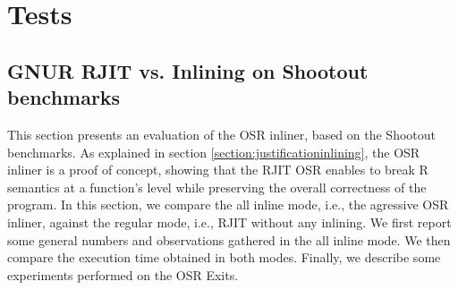 \section{Tests}
\subsection{GNUR RJIT vs. Inlining on Shootout benchmarks}

     


This section presents an evaluation of the OSR inliner, based on the Shootout benchmarks\cite{Shootout}.
As explained in section \ref{section:justificationinlining}, the OSR inliner is a proof of concept, showing that the RJIT OSR enables to break R semantics at a function's level while preserving the overall correctness of the program.
In this section, we compare the all inline mode, i.e., the agressive OSR inliner, against the regular mode, i.e., RJIT without any inlining.
We first report some general numbers and observations gathered in the all inline mode. 
We then compare the execution time obtained in both modes.
Finally, we describe some experiments performed on the OSR Exits.\\


